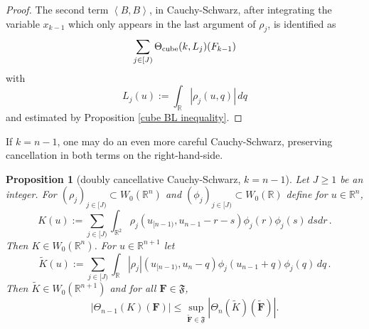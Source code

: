 \documentclass[12pt,reqno]{amsart}
\theoremstyle{plain}
\newtheorem{proposition}[theorem]{Proposition}
\numberwithin{equation}{section}
\theoremstyle{remark}
\newcommand{\R}{{\mathbb R}}
\newcommand{\F}{\mathbf{F}}
\begin{document}
\begin{proof}
The second term $\left< B , B \right>$, in Cauchy-Schwarz, after integrating the variable $x_{k-1}$ which only appears in the last argument of $\rho_j$,
is identified as
\begin{equation}
    \sum_{j\in[J)} \Theta_{\rm cube}(k,L_j)(F_{k-1})
\end{equation}
with
\begin{equation}
    L_j(u):=\int_\R |\rho_j(u,q)|\,dq
\end{equation}
and estimated by Proposition \ref{cube BL inequality}.
\end{proof}


If $k=n-1$, one may do an even more careful Cauchy-Schwarz, preserving cancellation in both terms on the right-hand-side.


\begin{proposition}[doubly cancellative Cauchy-Schwarz, $k=n-1$]\label{doubly cancellative Cauchy-Schwarz}
Let $J\ge 1$ be an integer. For $(\rho_j)_{j\in[J)}\subset W_0(\R^n)$ and
$(\phi_j)_{j\in [J)}\subset W_0(\R)$ define for $u\in \R^n$,
\begin{equation}\label{auto:Cauchy-Schwarz-terminal-kernel-K}
    K(u):=\sum_{j\in [J)}\int_{\R^2} \rho_j(u_{[n-1)}, u_{n-1}-r-s) \phi_j(r) \phi_j(s) \, ds dr\, .
\end{equation}
Then $K\in W_0(\R^n)$.
For $u\in\R^{n+1}$ let
\begin{equation}\label{auto:Cauchy-Schwarz-terminal-kernel-tilde-K}
    \tilde{K}(u):=\sum_{j\in [J)}\int_\R |\rho_j|(u_{[n-1)}, u_{n}-q) \phi_j(u_{n-1}+q) \phi_j(q) \, dq\, .
\end{equation}
Then $\tilde{K}\in W_0(\R^{n+1})$ and for all $\F\in\mathfrak{F}$,
\begin{equation}\label{auto:Cauchy-Schwarz-at-n-minus-one-bound}
    |\Theta_{n-1}(K)(\F)| \le \sup_{\mathbf{\tilde{F}}\in\mathfrak{F}} |\Theta_{n}(\tilde{K})(\mathbf{\tilde{F}})|.
\end{equation}
\end{proposition}
\end{document}
